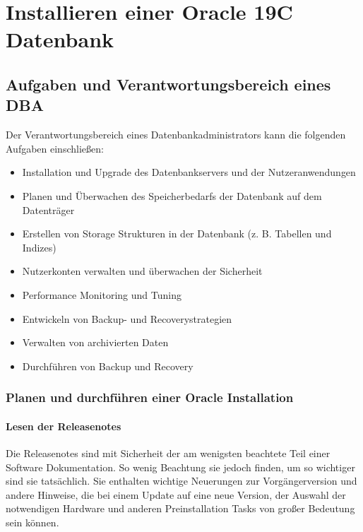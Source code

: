 \chapter{Installieren einer Oracle 19C Datenbank}
  \chaptertoc{}
  \cleardoubleevenpage
  
      \section{Aufgaben und Verantwortungsbereich eines DBA}
      Der Verantwortungsbereich eines Datenbankadministrators kann die folgenden Aufgaben einschließen:
      \begin{itemize}
        \item Installation und Upgrade des Datenbankservers und der Nutzeranwendungen
        \item Planen und Überwachen des Speicherbedarfs der Datenbank auf dem Datenträger
        \item Erstellen von Storage Strukturen in der Datenbank (z. B. Tabellen und Indizes)
        \item Nutzerkonten verwalten und überwachen der Sicherheit
        \item Performance Monitoring und Tuning
        \item Entwickeln von Backup- und Recoverystrategien
        \item Verwalten von archivierten Daten
        \item Durchführen von Backup und Recovery
      \end{itemize}
      \subsection{Planen und durchführen einer Oracle Installation}
        \subsubsection{Lesen der Releasenotes}
          Die Releasenotes sind mit Sicherheit der am wenigsten beachtete Teil einer Software Dokumentation. So wenig Beachtung sie jedoch finden, um so wichtiger sind sie tatsächlich. Sie enthalten wichtige Neuerungen zur Vorgängerversion und andere Hinweise, die bei einem Update auf eine neue Version, der Auswahl der notwendigen Hardware und anderen Preinstallation Tasks von großer Bedeutung sein können.

          \begin{literaturinternet}
            \item \cite{e23557}
            \item \cite{e23558}
          \end{literaturinternet}

